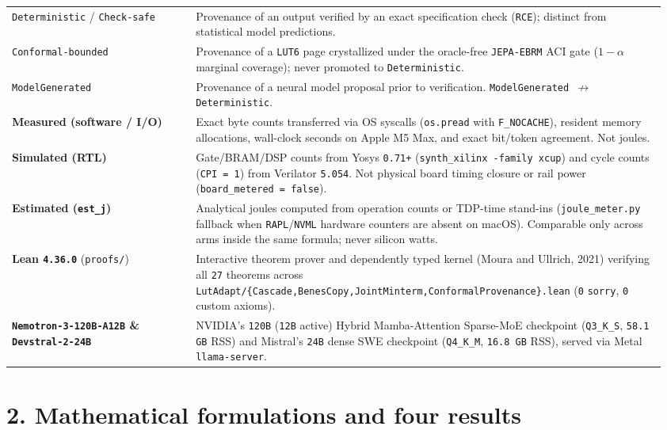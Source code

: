 \documentclass[10pt]{article}
\begin{document}
{\begin{longtable}{@{}L{0.27\linewidth}L{0.69\linewidth}@{}}
\addlinespace[3pt]
\texttt{Deterministic} / \texttt{Check-safe} & Provenance of an output verified by an exact specification check (\texttt{RCE}); distinct from statistical model predictions. \\
\addlinespace[3pt]
\texttt{Conformal-bounded} & Provenance of a \texttt{LUT6} page crystallized under the oracle-free \texttt{JEPA-EBRM} ACI gate ($1-\alpha$ marginal coverage); never promoted to \texttt{Deterministic}. \\
\addlinespace[3pt]
\texttt{ModelGenerated} & Provenance of a neural model proposal prior to verification. \texttt{ModelGenerated $\nrightarrow$ Deterministic}. \\
\addlinespace[3pt]
\textbf{Measured (software / I/O)} & Exact byte counts transferred via OS syscalls (\texttt{os.pread} with \texttt{F\_NOCACHE}), resident memory allocations, wall-clock seconds on Apple M5 Max, and exact bit/token agreement. Not joules. \\
\addlinespace[3pt]
\textbf{Simulated (RTL)} & Gate/BRAM/DSP counts from Yosys \texttt{0.71+} (\texttt{synth\_xilinx -family xcup}) and cycle counts (\texttt{CPI = 1}) from Verilator \texttt{5.054}. Not physical board timing closure or rail power (\texttt{board\_metered = false}). \\
\addlinespace[3pt]
\textbf{Estimated (\texttt{est\_j})} & Analytical joules computed from operation counts or TDP-time stand-ins (\texttt{joule\_meter.py} fallback when \texttt{RAPL}/\texttt{NVML} hardware counters are absent on macOS). Comparable only across arms inside the same formula; never silicon watts. \\
\addlinespace[3pt]
\textbf{Lean \texttt{4.36.0}} (\texttt{proofs/}) & Interactive theorem prover and dependently typed kernel (Moura and Ullrich, 2021) verifying all \texttt{27} theorems across \texttt{LutAdapt/\{Cascade,BenesCopy,JointMinterm,ConformalProvenance\}.lean} (\texttt{0} \texttt{sorry}, \texttt{0} custom axioms). \\
\addlinespace[3pt]
\textbf{\texttt{Nemotron-3-120B-A12B} \& \texttt{Devstral-2-24B}} & NVIDIA's \texttt{120B} (\texttt{12B} active) Hybrid Mamba-Attention Sparse-MoE checkpoint (\texttt{Q3\_K\_S}, \texttt{58.1 GB} RSS) and Mistral's \texttt{24B} dense SWE checkpoint (\texttt{Q4\_K\_M}, \texttt{16.8 GB} RSS), served via Metal \texttt{llama-server}. \\
\bottomrule
\end{longtable}
}

\section{2. Mathematical formulations and four results}\label{math-results}
\end{document}
